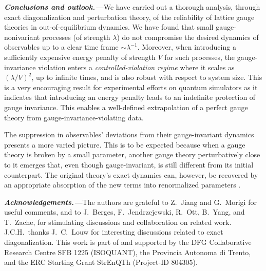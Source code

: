 \documentclass[aps,prl,reprint,twocolumn,superscriptaddress,floatfix,nofootinbib]{revtex4-1}
\begin{document}
	
	\textbf{\emph{Conclusions and outlook.---}}We have carried out a thorough analysis, through exact diagonalization and perturbation theory, of the reliability of lattice gauge theories in out-of-equilibrium dynamics. 
	We have found that small gauge-nonivariant processes (of strength $\lambda$) do not compromise the desired dynamics of observables up to a clear time frame $\sim \lambda^{-1}$. 
	Moreover, when introducing a sufficiently expensive energy penalty of strength $V$ for such processes, the gauge-invariance violation enters a \textit{controlled-violation regime} where it scales as $(\lambda/V)^2$, up to infinite times, and is also robust with respect to system size.
	This is a very encouraging result for experimental efforts on quantum simulators as it indicates that introducing an energy penalty leads to an indefinite protection of gauge invariance. This enables a well-defined extrapolation of a perfect gauge theory from gauge-invariance-violating data.
	
	The suppression in observables' deviations from their gauge-invariant dynamics presents a more varied picture. This is to be expected because when a gauge theory is broken by a small parameter, another gauge theory perturbatively close to it emerges \cite{Chubb2017} that, even though gauge-invariant, is still different from its initial counterpart. The original theory's exact dynamics can, however, be recovered by an appropriate absorption of the new terms into renormalized parameters \cite{Foerster1980,Poppitz2008}.  
	
	
	\textbf{\emph{Acknowledgements.---}}The authors are grateful to Z.~Jiang and G.~Morigi for useful comments, and to J.~Berges, F.~Jendrzejewski, R.~Ott, B.~Yang, and T.~Zache, for stimulating discussions and collaboration on related work. J.C.H.~thanks J.~C.~Louw for interesting discussions related to exact diagonalization.
	This work is part of and supported by the DFG Collaborative Research Centre SFB 1225 (ISOQUANT), the Provincia Autonoma di Trento, and the ERC Starting Grant StrEnQTh (Project-ID 804305). 
	
\end{document}
